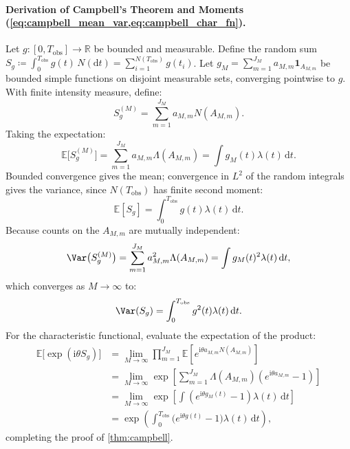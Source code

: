 \paragraph{Derivation of Campbell's Theorem and Moments
(\cref{eq:campbell_mean_var,eq:campbell_char_fn}).}
Let $g: [0, T_{\mathrm{obs}}] \to \mathbb{R}$ be bounded and
measurable. Define the
random sum $S_g \coloneqq \int_0^{T_{\mathrm{obs}}}
g(t)\,N(\mathrm{d}t) = \sum_{i=1}^{N(T_{\mathrm{obs}})} g(t_i)$.
Let $g_M=\sum_{m=1}^{J_M}a_{M,m}\mathbf{1}_{A_{M,m}}$ be bounded
simple functions on disjoint measurable sets, converging pointwise to $g$.
With finite intensity measure, define:
\begin{equation}
  S_g^{(M)} = \sum_{m=1}^{J_M} a_{M,m} N(A_{M,m}).
\end{equation}
Taking the expectation:
\begin{equation}
  \mathbb{E}\bigl[S_g^{(M)}\bigr]
  =\sum_{m=1}^{J_M}a_{M,m}\Lambda(A_{M,m})
  =\int g_M(t)\lambda(t)\,\mathrm{d}t.
\end{equation}
Bounded convergence gives the mean; convergence in $L^2$ of the random
integrals gives the variance, since $N(T_{\mathrm{obs}})$ has finite
second moment:
\begin{equation}
  \mathbb{E}[S_g] = \int_0^{T_{\mathrm{obs}}} g(t)\lambda(t)\,\mathrm{d}t.
  \label{eq:supp_campbell_mean}
\end{equation}
Because counts on the $A_{M,m}$ are mutually independent:
\begin{equation}
  \Var\bigl(S_g^{(M)}\bigr)
  =\sum_{m=1}^{J_M}a_{M,m}^2\Lambda(A_{M,m})
  =\int g_M(t)^2\lambda(t)\,\mathrm{d}t,
\end{equation}
which converges as $M \to \infty$ to:
\begin{equation}
  \Var(S_g) = \int_0^{T_{\mathrm{obs}}} g^2(t)\lambda(t)\,\mathrm{d}t.
  \label{eq:supp_campbell_var}
\end{equation}
For the characteristic functional, evaluate the expectation of the product:
\begin{equation}
  \begin{aligned}
    \mathbb{E}\bigl[\exp(\mathrm{i}\theta S_g)\bigr]
    &= \lim_{M \to \infty} \prod_{m=1}^{J_M}
    \mathbb{E}\left[e^{\mathrm{i}\theta a_{M,m}N(A_{M,m})}\right] \\
    &= \lim_{M \to \infty}\exp\left[
    \sum_{m=1}^{J_M}\Lambda(A_{M,m})(e^{\mathrm{i}\theta a_{M,m}}-1)\right] \\
    &= \lim_{M \to \infty}\exp\left[
    \int(e^{\mathrm{i}\theta g_M(t)}-1)\lambda(t)\,\mathrm{d}t\right] \\
    &= \exp\left( \int_0^{T_{\mathrm{obs}}}
    \bigl(e^{\mathrm{i}\theta g(t)} - 1\bigr)\lambda(t)\,\mathrm{d}t \right),
  \end{aligned}
  \label{eq:supp_char_functional}
\end{equation}
completing the proof of \cref{thm:campbell}.

